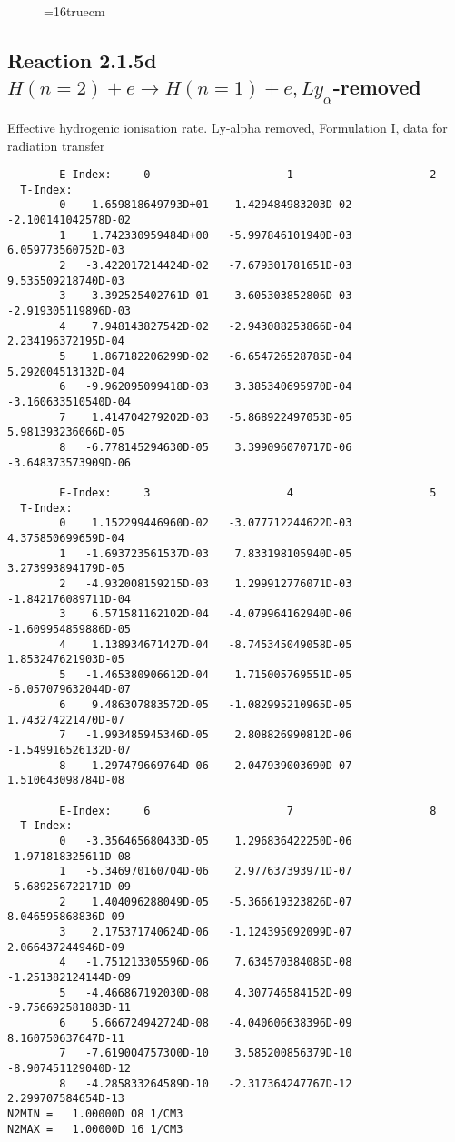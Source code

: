 \documentclass[12pt,dvipdfmx]{article}
\begin{document}
\begin{figure} \label{2.1.5c}
\epsfxsize=16truecm
\end{figure}
\newpage
\subsection{
Reaction 2.1.5d  $H(n=2) + e \rightarrow H(n=1) + e, Ly_\alpha$-removed}


   Effective hydrogenic ionisation rate.
   Ly-alpha removed, Formulation I, data for radiation transfer

\begin{small}\begin{verbatim}
        E-Index:     0                     1                     2
  T-Index:
        0   -1.659818649793D+01    1.429484983203D-02   -2.100141042578D-02
        1    1.742330959484D+00   -5.997846101940D-03    6.059773560752D-03
        2   -3.422017214424D-02   -7.679301781651D-03    9.535509218740D-03
        3   -3.392525402761D-01    3.605303852806D-03   -2.919305119896D-03
        4    7.948143827542D-02   -2.943088253866D-04    2.234196372195D-04
        5    1.867182206299D-02   -6.654726528785D-04    5.292004513132D-04
        6   -9.962095099418D-03    3.385340695970D-04   -3.160633510540D-04
        7    1.414704279202D-03   -5.868922497053D-05    5.981393236066D-05
        8   -6.778145294630D-05    3.399096070717D-06   -3.648373573909D-06

        E-Index:     3                     4                     5
  T-Index:
        0    1.152299446960D-02   -3.077712244622D-03    4.375850699659D-04
        1   -1.693723561537D-03    7.833198105940D-05    3.273993894179D-05
        2   -4.932008159215D-03    1.299912776071D-03   -1.842176089711D-04
        3    6.571581162102D-04   -4.079964162940D-06   -1.609954859886D-05
        4    1.138934671427D-04   -8.745345049058D-05    1.853247621903D-05
        5   -1.465380906612D-04    1.715005769551D-05   -6.057079632044D-07
        6    9.486307883572D-05   -1.082995210965D-05    1.743274221470D-07
        7   -1.993485945346D-05    2.808826990812D-06   -1.549916526132D-07
        8    1.297479669764D-06   -2.047939003690D-07    1.510643098784D-08

        E-Index:     6                     7                     8
  T-Index:
        0   -3.356465680433D-05    1.296836422250D-06   -1.971818325611D-08
        1   -5.346970160704D-06    2.977637393971D-07   -5.689256722171D-09
        2    1.404096288049D-05   -5.366619323826D-07    8.046595868836D-09
        3    2.175371740624D-06   -1.124395092099D-07    2.066437244946D-09
        4   -1.751213305596D-06    7.634570384085D-08   -1.251382124144D-09
        5   -4.466867192030D-08    4.307746584152D-09   -9.756692581883D-11
        6    5.666724942724D-08   -4.040606638396D-09    8.160750637647D-11
        7   -7.619004757300D-10    3.585200856379D-10   -8.907451129040D-12
        8   -4.285833264589D-10   -2.317364247767D-12    2.299707584654D-13
N2MIN =   1.00000D 08 1/CM3
N2MAX =   1.00000D 16 1/CM3


\end{verbatim}
\end{small}
\end{document}
